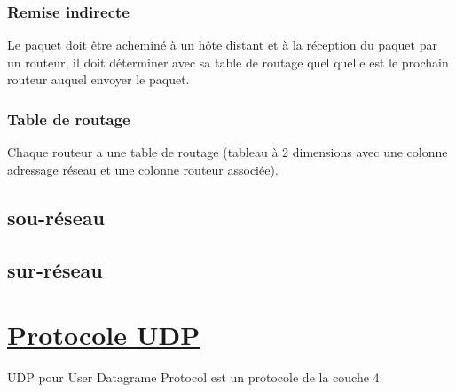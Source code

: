 \documentclass{article}
\begin{document}
\subsubsection*{Remise indirecte}
Le paquet doit être acheminé à un hôte distant et à la réception du paquet par un routeur, il doit déterminer avec sa table de routage quel quelle est le prochain routeur auquel envoyer le paquet.

\newpage 
\subsubsection*{Table de routage}
Chaque routeur a une table de routage (tableau à 2 dimensions avec une colonne adressage réseau et une colonne routeur associée).
\subsection{sou-réseau}
\subsection{sur-réseau}
\section{\underline{Protocole UDP}}
UDP pour User Datagrame Protocol est un protocole de la couche 4.
\end{document}
